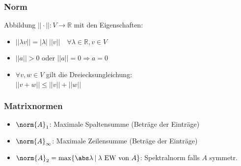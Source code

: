 \documentclass[german, fourcolumn, 8pt]{latex4ei/latex4ei_sheet}
\begin{document}
\begin{sectionbox}
    \subsubsection{Norm}
    Abbildung $||\cdot||:V \rightarrow\mathbb R$ mit den Eigenschaften:
    \begin{itemize}
        \item $||\lambda v||=|\lambda| \: ||v|| \quad \forall \lambda \in \mathbb R, v \in V$
        \item $||a|| > 0$ oder $||a|| = 0 \Rightarrow a = 0$
        \item $\forall v,w \in V$ gilt die Dreiecksungleichung: \\
              $||v + w|| \le ||v|| + ||w||$
    \end{itemize}

    \subsubsection{Matrixnormen}
    \begin{itemize}
        \item $\norm{A}_1$: Maximale Spaltensumme (Beträge der Einträge)
        \item $\norm{A}_\infty$: Maximale Zeilensumme (Beträge der Einträge)
        \item $\norm{A}_2=\max\{\abs \lambda \: \vert \: \lambda \text{ EW von }A\}$: Spektralnorm falls $A$ symmetr.
    \end{itemize}
\end{sectionbox}
\end{document}

